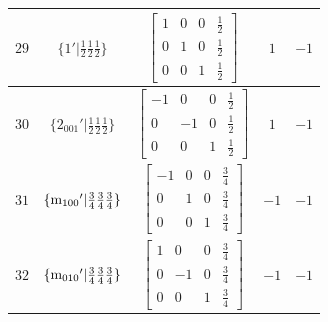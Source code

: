 \documentclass[fleqn,8pt]{jsarticle}
\begin{document}
\begin{longtable}{ccccc}
$ 29 $ & $ \{1{}'|\frac{1}{2} \frac{1}{2} \frac{1}{2}\} $ & $ \begin{bmatrix} 1 & 0 & 0 & \frac{1}{2} \\ 0 & 1 & 0 & \frac{1}{2} \\ 0 & 0 & 1 & \frac{1}{2} \end{bmatrix} $ & $ 1 $ & $ -1 $ \\ \hline
$ 30 $ & $ \{2{}_{001}{}'|\frac{1}{2} \frac{1}{2} \frac{1}{2}\} $ & $ \begin{bmatrix} -1 & 0 & 0 & \frac{1}{2} \\ 0 & -1 & 0 & \frac{1}{2} \\ 0 & 0 & 1 & \frac{1}{2} \end{bmatrix} $ & $ 1 $ & $ -1 $ \\ \hline
$ 31 $ & $ \{{\rm m}_{100}{}'|\frac{3}{4} \frac{3}{4} \frac{3}{4}\} $ & $ \begin{bmatrix} -1 & 0 & 0 & \frac{3}{4} \\ 0 & 1 & 0 & \frac{3}{4} \\ 0 & 0 & 1 & \frac{3}{4} \end{bmatrix} $ & $ -1 $ & $ -1 $ \\ \hline
$ 32 $ & $ \{{\rm m}_{010}{}'|\frac{3}{4} \frac{3}{4} \frac{3}{4}\} $ & $ \begin{bmatrix} 1 & 0 & 0 & \frac{3}{4} \\ 0 & -1 & 0 & \frac{3}{4} \\ 0 & 0 & 1 & \frac{3}{4} \end{bmatrix} $ & $ -1 $ & $ -1 $ \\
\end{longtable}
\end{document}
